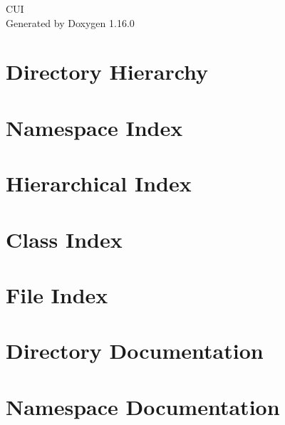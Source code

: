 \documentclass[twoside]{book}
\newcommand{\+}{\discretionary{\mbox{\scriptsize$\hookleftarrow$}}{}{}}
\newcommand{\clearemptydoublepage}{%
    \newpage{\pagestyle{empty}\cleardoublepage}%
  }
\begin{document}
  \raggedbottom
    \hypersetup{pageanchor=false,
                bookmarksnumbered=true,
                pdfencoding=unicode
               }
  \begin{titlepage}
  \vspace*{7cm}
  \begin{center}%
  {\Large CUI}\\
  \vspace*{1cm}
  {\large Generated by Doxygen 1.16.0}\\
  \end{center}
  \end{titlepage}
  \clearemptydoublepage
  \tableofcontents
  \clearemptydoublepage
  \hypersetup{pageanchor=true}








\chapter{Directory Hierarchy}

\chapter{Namespace Index}

\chapter{Hierarchical Index}

\chapter{Class Index}

\chapter{File Index}

\chapter{Directory Documentation}


\chapter{Namespace Documentation}




\end{document}
